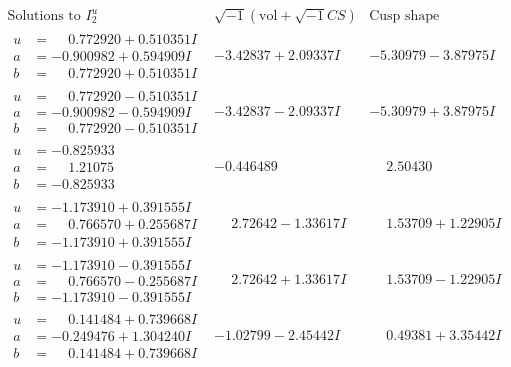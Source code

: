 \documentclass[1p]{elsarticle_modified}
\theoremstyle{definition}
\newcommand{\I}{\sqrt{-1}}
\begin{document}
$$\begin{array}{c|c|c}  
\text{Solutions to }I^u_{2}& \I (\text{vol} + \sqrt{-1}CS) & \text{Cusp shape}\\
 \hline 
\begin{aligned}
u &= \phantom{-}0.772920 + 0.510351 I \\
a &= -0.900982 + 0.594909 I \\
b &= \phantom{-}0.772920 + 0.510351 I\end{aligned}
 & -3.42837 + 2.09337 I & -5.30979 - 3.87975 I \\ \hline\begin{aligned}
u &= \phantom{-}0.772920 - 0.510351 I \\
a &= -0.900982 - 0.594909 I \\
b &= \phantom{-}0.772920 - 0.510351 I\end{aligned}
 & -3.42837 - 2.09337 I & -5.30979 + 3.87975 I \\ \hline\begin{aligned}
u &= -0.825933\phantom{ +0.000000I} \\
a &= \phantom{-}1.21075\phantom{ +0.000000I} \\
b &= -0.825933\phantom{ +0.000000I}\end{aligned}
 & -0.446489\phantom{ +0.000000I} & \phantom{-}2.50430\phantom{ +0.000000I} \\ \hline\begin{aligned}
u &= -1.173910 + 0.391555 I \\
a &= \phantom{-}0.766570 + 0.255687 I \\
b &= -1.173910 + 0.391555 I\end{aligned}
 & \phantom{-}2.72642 - 1.33617 I & \phantom{-}1.53709 + 1.22905 I \\ \hline\begin{aligned}
u &= -1.173910 - 0.391555 I \\
a &= \phantom{-}0.766570 - 0.255687 I \\
b &= -1.173910 - 0.391555 I\end{aligned}
 & \phantom{-}2.72642 + 1.33617 I & \phantom{-}1.53709 - 1.22905 I \\ \hline\begin{aligned}
u &= \phantom{-}0.141484 + 0.739668 I \\
a &= -0.249476 + 1.304240 I \\
b &= \phantom{-}0.141484 + 0.739668 I\end{aligned}
 & -1.02799 - 2.45442 I & \phantom{-}0.49381 + 3.35442 I \\ \hline\begin{aligned}

\end{aligned}
\end{array}$$
\end{document}
